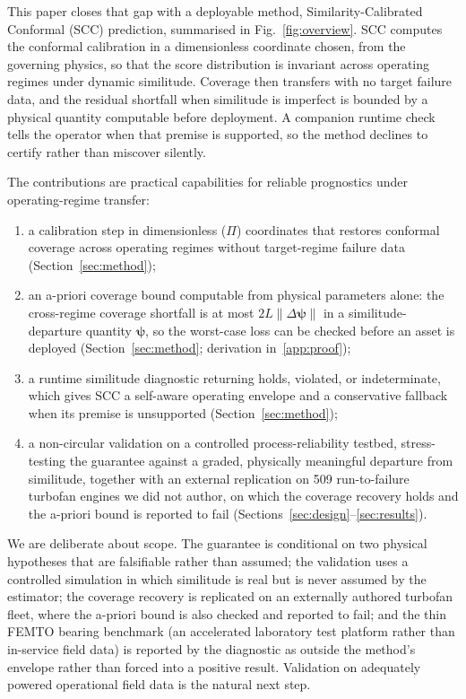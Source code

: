 \documentclass[review,times]{elsarticle}
\theoremstyle{definition}
\theoremstyle{remark}
\begin{document}
This paper closes that gap with a deployable method, Similarity-Calibrated Conformal (SCC)
prediction, summarised in Fig.~\ref{fig:overview}. SCC computes the conformal calibration in a
dimensionless coordinate chosen, from the governing physics, so that the score distribution is
invariant across operating regimes under dynamic similitude. Coverage then transfers with no target
failure data, and the residual shortfall when similitude is imperfect is bounded by a physical
quantity computable before deployment. A companion runtime check tells the operator when that
premise is supported, so the method declines to certify rather than miscover silently.

The contributions are practical capabilities for reliable prognostics under operating-regime
transfer:
\begin{enumerate}
\item a calibration step in dimensionless ($\Pi$) coordinates that restores conformal coverage
across operating regimes without target-regime failure data (Section~\ref{sec:method});
\item an a-priori coverage bound computable from physical parameters alone: the cross-regime
coverage shortfall is at most $2L\lVert\Delta\boldsymbol\psi\rVert$ in a similitude-departure
quantity $\boldsymbol\psi$, so the worst-case loss can be checked before an asset is deployed
(Section~\ref{sec:method}; derivation in~\ref{app:proof});
\item a runtime similitude diagnostic returning holds, violated, or indeterminate, which gives SCC a
self-aware operating envelope and a conservative fallback when its premise is unsupported
(Section~\ref{sec:method});
\item a non-circular validation on a controlled process-reliability testbed, stress-testing the
guarantee against a graded, physically meaningful departure from similitude, together with an
external replication on 509 run-to-failure turbofan engines we did not author, on which the
coverage recovery holds and the a-priori bound is reported to fail
(Sections~\ref{sec:design}--\ref{sec:results}).
\end{enumerate}

We are deliberate about scope. The guarantee is conditional on two physical hypotheses that are
falsifiable rather than assumed; the validation uses a controlled simulation in which similitude is
real but is never assumed by the estimator; the coverage recovery is replicated on an externally
authored turbofan fleet, where the a-priori bound is also checked and reported to fail; and the thin
FEMTO bearing benchmark (an accelerated laboratory test platform rather than in-service field data)
is reported by the diagnostic as outside the method's envelope rather than forced into a positive
result. Validation on adequately powered operational field data is the natural next step.
\end{document}
